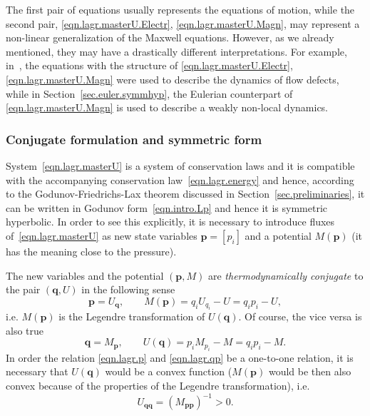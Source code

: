 \documentclass[twoside]{article}
\newcommand{\qq}{{\boldsymbol{q}}}
\newcommand{\pp}{{\boldsymbol{p}}}
\newcommand{\IP}[1]{ \textcolor{blue}   {\small\texttt{
\texttt{[image: pin\_small.jpeg]} Ilya: #1}} }
\newcommand{\MP}[1]{ \textcolor{Green}   {\small\texttt{
\texttt{[image: pin\_small.jpeg]} Michal: #1}} }
\begin{document}
The first pair of equations usually represents the equations of motion, while 
the second pair, \eqref{eqn.lagr.masterU.Electr}, 
\eqref{eqn.lagr.masterU.Magn}, may represent a non-linear generalization of the 
Maxwell equations. However, 
as we already 
mentioned, they may have a drastically 
different interpretations. For example, in~\cite{PeshGrmRom2015}, the equations 
with 
the 
structure of \eqref{eqn.lagr.masterU.Electr}, \eqref{eqn.lagr.masterU.Magn} 
were used to describe the dynamics of flow defects, while in 
Section~\ref{sec.euler.symmhyp}, the Eulerian counterpart of 
\eqref{eqn.lagr.masterU.Magn} is used to describe a weakly non-local dynamics.



%
\subsubsection{Conjugate formulation and symmetric form}\label{sec.conj.lagr}

System~\eqref{eqn.lagr.masterU} is a system of conservation laws and it is 
compatible with the accompanying conservation law~\eqref{eqn.lagr.energy} and 
hence, according to the Godunov-Friedrichs-Lax theorem discussed in 
Section~\ref{sec.preliminaries}, it can be written in Godunov 
form~\eqref{eqn.intro.Lp} and hence it is symmetric hyperbolic. In order to see 
this explicitly, it is necessary to introduce fluxes 
of~\eqref{eqn.lagr.masterU} as new state variables 
$ \pp=[p_i] $ and a potential $ M(\pp) $ (it has the meaning close to the 
pressure).

The new variables and the potential $ (\pp,M) $ are \textit{thermodynamically 
conjugate} 
to the pair 
$ (\qq,U) $ in the following sense
\begin{equation}\label{eqn.lagr.p}
\pp=U_{\qq},\qquad M(\pp) = q_i U_{q_i} - U = q_ip_i - U,
\end{equation}
i.e. $ M(\pp) $ is the Legendre transformation of $ U(\qq) $. Of course, the 
vice versa is also true
\begin{equation}\label{eqn.lagr.qp}
\qq=M_{\pp},\qquad U(\qq) = p_i M_{p_i} - M = q_ip_i - M.
\end{equation}
In order the relation \eqref{eqn.lagr.p} and \eqref{eqn.lagr.qp} be a 
one-to-one relation, it is necessary that $ U(\qq) $ would be a convex 
function 
($ M(\pp) $ would be then also convex because of the properties of the 
Legendre 
transformation), i.e.
\begin{equation}
U_{\qq\qq}= (M_{\pp\pp})^{-1} > 0.
\end{equation}
\end{document}
